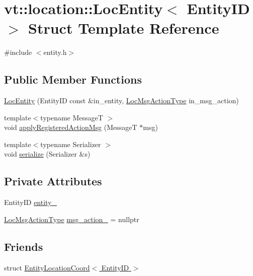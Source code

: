 \hypertarget{structvt_1_1location_1_1_loc_entity}{}\section{vt\+:\+:location\+:\+:Loc\+Entity$<$ Entity\+ID $>$ Struct Template Reference}
\label{structvt_1_1location_1_1_loc_entity}


{\ttfamily \#include $<$entity.\+h$>$}

\subsection*{Public Member Functions}
\begin{DoxyCompactItemize}
\item 
\hyperlink{structvt_1_1location_1_1_loc_entity_a41d90430d63f4e299e1c888fcf9d3238}{Loc\+Entity} (Entity\+ID const \&in\+\_\+entity, \hyperlink{namespacevt_1_1location_ad0a130e4d79e745543925240e13e8f08}{Loc\+Msg\+Action\+Type} in\+\_\+msg\+\_\+action)
\item 
{\footnotesize template$<$typename MessageT $>$ }\\void \hyperlink{structvt_1_1location_1_1_loc_entity_a7675dd0ee13bc5b759b6a4313d521e04}{apply\+Registered\+Action\+Msg} (MessageT $\ast$msg)
\item 
{\footnotesize template$<$typename Serializer $>$ }\\void \hyperlink{structvt_1_1location_1_1_loc_entity_a4f6c7f2b97e0676d9411fc2ef42f0a23}{serialize} (Serializer \&s)
\end{DoxyCompactItemize}
\subsection*{Private Attributes}
\begin{DoxyCompactItemize}
\item 
Entity\+ID \hyperlink{structvt_1_1location_1_1_loc_entity_ad2d2ed3292e402f3bf8bf0f1f9c7281f}{entity\+\_\+}
\item 
\hyperlink{namespacevt_1_1location_ad0a130e4d79e745543925240e13e8f08}{Loc\+Msg\+Action\+Type} \hyperlink{structvt_1_1location_1_1_loc_entity_adb5c5c69306a18af15b7af3050a45dfa}{msg\+\_\+action\+\_\+} = nullptr
\end{DoxyCompactItemize}
\subsection*{Friends}
\begin{DoxyCompactItemize}
\item 
struct \hyperlink{structvt_1_1location_1_1_loc_entity_abf8115ee4795af8b482a657aa6195a6a}{Entity\+Location\+Coord$<$ Entity\+I\+D $>$}
\end{DoxyCompactItemize}


